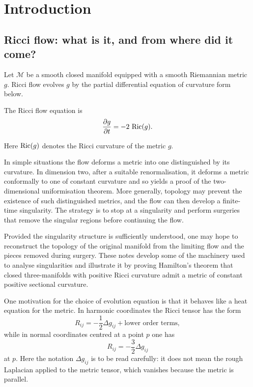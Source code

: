 \chapter{Introduction}

\section{Ricci flow: what is it, and from where did it come?}

Let $\mathcal M$ be a smooth closed manifold equipped with a smooth Riemannian
metric $g$. Ricci flow evolves $g$ by the partial differential equation
of curvature form below.

\begin{definition}
\label{topping-intro-ricci-flow-evolution}
The Ricci flow equation is
\[
\frac{\partial g}{\partial t} = -2\,\operatorname{Ric}(g).
\]
\end{definition}

\begin{remark}
\label{topping-intro-ricci-curvature}
Here $\operatorname{Ric}(g)$ denotes the Ricci curvature of the metric $g$.
\end{remark}

In simple situations the flow deforms a metric into one distinguished by its
curvature. In dimension two, after a suitable renormalisation, it deforms a
metric conformally to one of constant curvature and so yields a proof of the
two-dimensional uniformisation theorem. More generally, topology may prevent
the existence of such distinguished metrics, and the flow can then develop a
finite-time singularity. The strategy is to stop at a singularity and perform
surgeries that remove the singular regions before continuing the flow.

Provided the singularity structure is sufficiently understood, one may hope to
reconstruct the topology of the original manifold from the limiting flow and
the pieces removed during surgery. These notes develop some of the machinery
used to analyse singularities and illustrate it by proving Hamilton's theorem
that closed three-manifolds with positive Ricci curvature admit a metric of
constant positive sectional curvature.

One motivation for the choice of evolution equation is that it behaves like a
heat equation for the metric. In harmonic coordinates the Ricci tensor has the
form
\[
R_{ij} = -\frac12 \Delta g_{ij} + \text{lower order terms},
\]
while in normal coordinates centred at a point $p$ one has
\[
R_{ij} = -\frac32 \Delta g_{ij}
\]
at $p$. Here the notation $\Delta g_{ij}$ is to be read carefully: it does not
mean the rough Laplacian applied to the metric tensor, which vanishes because
the metric is parallel.

